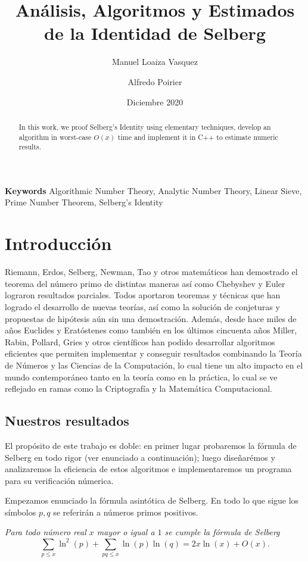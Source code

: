 \documentclass[10pt]{article}
\title{An\'alisis, Algoritmos y Estimados de la Identidad de Selberg}
\author[1]{Manuel Loaiza Vasquez}
\author[2]{Alfredo Poirier}
\affil[1, 2]{Departamento de Matem\'aticas,  
Pontificia Universidad Cat\'olica del Per\'u, Lima, Per\'u}
\date{Diciembre 2020}
\providecommand{\keywords}[1]
{
  \bigskip
  \textbf{Keywords} #1
}
\theoremstyle{definition}
\theoremstyle{remark}
\begin{document}
\maketitle

\begin{abstract}

In this work, we proof Selberg's Identity using elementary techniques,
develop an algorithm in worst-case $O(x)$ time and
implement it in C++ to estimate numeric results.
\end{abstract}
\keywords{Algorithmic Number Theory, Analytic Number Theory, Linear Sieve, Prime Number Theorem, Selberg's Identity}

\section{Introducci\'on}
Riemann, Erdos, Selberg, Newman, Tao y otros matem\'aticos han demostrado el
teorema del n\'umero primo de distintas maneras as\'i como Chebyshev y Euler lograron resultados parciales.
Todos aportaron teoremas y t\'ecnicas que han
logrado el desarrollo de nuevas teor\'ias, as\'i como la soluci\'on de conjeturas y propuestas
de hip\'otesis a\'un sin una demostraci\'on.
Adem\'as, desde hace miles de a\~nos Euclides y Erat\'ostenes
como tambi\'en en los \'ultimos cincuenta a\~nos Miller, Rabin, Pollard, Gries y
otros cient\'ificos han podido desarrollar algoritmos eficientes que permiten implementar y conseguir resultados
combinando la Teor\'ia de N\'umeros y las Ciencias de la Computaci\'on,
lo cual tiene un alto impacto en el mundo contempor\'aneo tanto en la teor\'ia como en la pr\'actica,
lo cual se ve reflejado en ramas como la Criptograf\'ia y la Matem\'atica Computacional.
 
\subsection{Nuestros resultados}
El prop\'osito de este trabajo es doble: 
en primer lugar probaremos la f\'ormula de Selberg en todo rigor (ver enunciado a continuaci\'on); 
luego diseñar\'emos y analizaremos la eficiencia de estos algoritmos e
implementaremos un programa para su verificaci\'on n\'umerica.
\bigskip

Empezamos enunciado la f\'ormula asint\'otica de Selberg. 
En todo lo que sigue los s\'imbolos $p,q$ se referir\'an a n\'umeros primos positivos.
\bigskip

{\it Para todo n\'umero real $x$ mayor o igual a $1$ se cumple la f\'ormula de Selberg}
\[
\sum_{p \leq x} \ln^2(p) + \sum_{pq \leq x} \ln(p) \ln(q) = 2x\ln(x) + O(x).
\]
\end{document}
